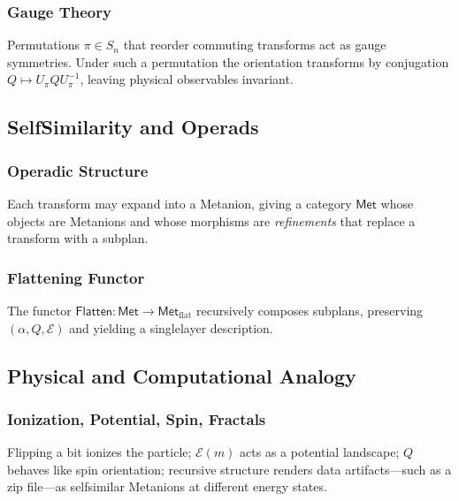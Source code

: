 \documentclass{article}
\begin{document}
\subsubsection{Gauge Theory}
Permutations $\pi \in S_n$ that reorder commuting transforms act as gauge symmetries. Under such a permutation the orientation transforms by conjugation $Q \mapsto U_{\pi} Q U_{\pi}^{-1}$, leaving physical observables invariant.

\subsection{Self\textendash Similarity and Operads}
\subsubsection{Operadic Structure}
Each transform may expand into a Metanion, giving a category $\mathsf{Met}$ whose objects are Metanions and whose morphisms are \emph{refinements} that replace a transform with a subplan.

\subsubsection{Flattening Functor}
The functor $\mathsf{Flatten}: \mathsf{Met} \to \mathsf{Met}_{\text{flat}}$ recursively composes subplans, preserving $(\alpha,Q,\mathcal{E})$ and yielding a single\textendash layer description.

\subsection{Physical and Computational Analogy}
\subsubsection{Ionization, Potential, Spin, Fractals}
Flipping a bit ionizes the particle; $\mathcal{E}(m)$ acts as a potential landscape; $Q$ behaves like spin orientation; recursive structure renders data artifacts---such as a zip file---as self\textendash similar Metanions at different energy states.
\end{document}
